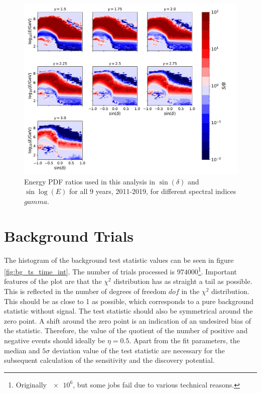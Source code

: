 \begin{figure}
    \centering
    \includegraphics[width=\linewidth]{Plots/05_csky/energy_pdf_ratio.pdf}
    \caption{Energy PDF ratios used in this analysis in $\sin{(\delta)}$ and $\sin{\log{(E)}}$ for all $\num{9}$ years, 2011-2019, for different spectral indices $gamma$.}
\end{figure}

\section{Background Trials}

The histogram of the background test statistic values can be seen in figure \ref{fig:bg_ts_time_int}.
The number of trials processed is $\num{974000}$\footnote{Originally $\num{e6}$, but some jobs fail due to various technical reasons.}.
Important features of the plot are that the $\chi^2$ distribution has as straight a tail as possible.
This is reflected in the number of degrees of freedom $dof$ in the $\chi^2$ distribution.
This should be as close to 1 as possible, which corresponds to a pure background statistic without signal.
The test statistic should also be symmetrical around the zero point.
A shift around the zero point is an indication of an undesired bias of the statistic.
Therefore, the value of the quotient of the number of positive and negative events should ideally be $\eta = \num{0.5}$.
Apart from the fit parameters, the median and $5\sigma$ deviation value of the test statistic are necessary for the subsequent calculation of the sensitivity and the discovery potential.

